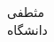 \documentclass[a4paper, 11pt, sans]{article}
\newcommand*{\scholarsocialsymbol}{\texttt{[image: google-scholar]}}
\begin{document}
	
		
		{\Huge مثطفی} \\ \vspace{2pt} 
		دانشگاه
		\vspace{5pt}
		
%				
%				
%				
%				
%				
%				
%				
\end{document}
